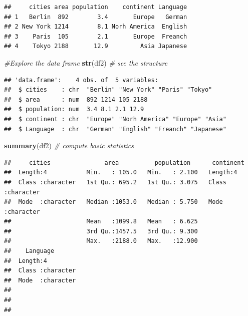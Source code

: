 \documentclass[
]{article}
\newenvironment{Shaded}{\begin{snugshade}}{\end{snugshade}}
\newcommand{\CommentTok}[1]{\textcolor[rgb]{0.56,0.35,0.01}{\textit{#1}}}
\newcommand{\FunctionTok}[1]{\textcolor[rgb]{0.13,0.29,0.53}{\textbf{#1}}}
\newcommand{\NormalTok}[1]{#1}
\newcommand{\OtherTok}[1]{\textcolor[rgb]{0.56,0.35,0.01}{#1}}
\newcommand{\SpecialCharTok}[1]{\textcolor[rgb]{0.81,0.36,0.00}{\textbf{#1}}}
\begin{document}
\begin{verbatim}
##     cities area population    continent Language
## 1   Berlin  892        3.4       Europe   German
## 2 New York 1214        8.1 Norh America  English
## 3    Paris  105        2.1       Europe  Freanch
## 4    Tokyo 2188       12.9         Asia Japanese
\end{verbatim}

\begin{Shaded}
\begin{Highlighting}[]
\CommentTok{\#Explore the data frame}
\FunctionTok{str}\NormalTok{(df2) }\CommentTok{\# see the structure}
\end{Highlighting}
\end{Shaded}

\begin{verbatim}
## 'data.frame':    4 obs. of  5 variables:
##  $ cities    : chr  "Berlin" "New York" "Paris" "Tokyo"
##  $ area      : num  892 1214 105 2188
##  $ population: num  3.4 8.1 2.1 12.9
##  $ continent : chr  "Europe" "Norh America" "Europe" "Asia"
##  $ Language  : chr  "German" "English" "Freanch" "Japanese"
\end{verbatim}

\begin{Shaded}
\begin{Highlighting}[]
\FunctionTok{summary}\NormalTok{(df2) }\CommentTok{\# compute basic statistics}
\end{Highlighting}
\end{Shaded}

\begin{verbatim}
##     cities               area          population      continent        
##  Length:4           Min.   : 105.0   Min.   : 2.100   Length:4          
##  Class :character   1st Qu.: 695.2   1st Qu.: 3.075   Class :character  
##  Mode  :character   Median :1053.0   Median : 5.750   Mode  :character  
##                     Mean   :1099.8   Mean   : 6.625                     
##                     3rd Qu.:1457.5   3rd Qu.: 9.300                     
##                     Max.   :2188.0   Max.   :12.900                     
##    Language        
##  Length:4          
##  Class :character  
##  Mode  :character  
##                    
##                    
## 
\end{verbatim}

\begin{Shaded}
\end{Shaded}
\end{document}
